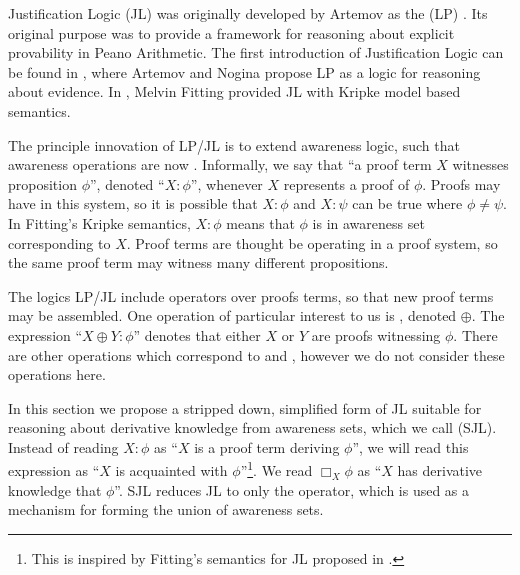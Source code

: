 Justification Logic (JL) was originally developed by Artemov as the
 (LP) {\cite{artemov_logic_1994}}.  Its original
purpose was to provide a framework for reasoning about explicit provability in
Peano Arithmetic.  The first introduction of Justification Logic can be found
in {\cite{artemov_introducing_2005}}, where Artemov and Nogina propose LP as a
logic for reasoning about evidence.  In {\cite{fitting_logic_2005}}, Melvin
Fitting provided JL with Kripke model based semantics.

The principle innovation of LP/JL is to extend awareness logic, such that
awareness operations are now .  Informally, we say that
``a proof term $X$ witnesses proposition $\phi$'', denoted ``$X : \phi$'',
whenever $X$ represents a proof of $\phi$.  Proofs may have
{} in this system, so it is possible that $X :
\phi$ and $X : \psi$ can be true where $\phi \neq \psi$.  In Fitting's Kripke
semantics, $X : \phi$ means that $\phi$ is in awareness set corresponding to
$X$.  Proof terms are thought be operating in a 
proof system, so the same proof term may witness many different propositions.

The logics LP/JL include operators over proofs terms, so that new proof terms
may be assembled.  One operation of particular interest to us is
{}, denoted $\oplus$.  The expression ``$X \oplus Y : \phi$''
denotes that either $X$ or $Y$ are proofs witnessing $\phi$.  There are other
operations which correspond to  and
, however we do not consider these
operations here.

In this section we propose a stripped down, simplified form of JL suitable for reasoning
about derivative knowledge from awareness sets, which we call 
 (SJL). Instead of reading $X :
\phi$ as ``$X$ is a proof term deriving $\phi$'', we will read this
expression as ``$X$ is acquainted with $\phi$''\footnote{This is
  inspired by Fitting's semantics for JL proposed in
  \cite{fitting_logic_2005}.}.  We read $\Box_X\phi$ as ``$X$ has
derivative knowledge that $\phi$''.
SJL reduces JL to only the {} operator, which is used as a 
mechanism for forming the union of awareness sets.

